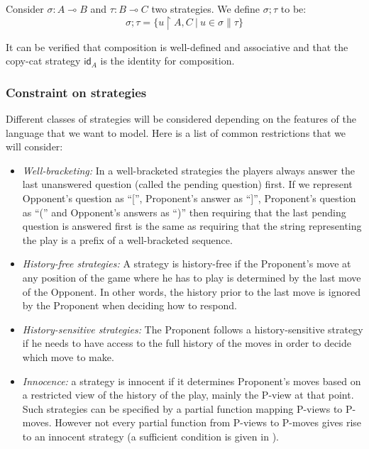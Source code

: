 \begin{dfn}
Consider $\sigma : A \multimap B$ and  $\tau : B \multimap C$ two
strategies. We define $\sigma ; \tau$ to be:
$$ \sigma ; \tau = \{ u \upharpoonright A,C \ | \ u \in \sigma \|
\tau \}$$
\end{dfn}

It can be verified that composition is well-defined and associative
\citep{hylandong_pcf} and that the copy-cat strategy $\textsf{id}_A$ is the identity for composition.

\subsubsection{Constraint on strategies}

Different classes of strategies will be considered depending on the
features of the language that we want to model. Here is a list of
common restrictions that we will consider:
\begin{itemize}
\item \emph{Well-bracketing:} In a well-bracketed strategies the players always answer the last unanswered question (called the pending question) first.
If we represent Opponent's question as ``['', Proponent's answer as
``]'', Proponent's question as ``('' and Opponent's answers as ``)''
then requiring that the last pending question is answered first is
the same as requiring that the string representing the play is a
prefix of a well-bracketed sequence.

\item \emph{History-free strategies:} A strategy is history-free if the Proponent's move at any position of the game where he has to play
is determined by the last move of the Opponent. In other words, the
history prior to the last move is ignored by the Proponent when
deciding how to respond.

\item \emph{History-sensitive strategies:} The Proponent follows a history-sensitive strategy if he needs to have access to the full
history of the moves in order to decide which move to make.

\item \emph{Innocence:} a strategy is innocent if it determines Proponent's moves based on a restricted view of the history of the play, mainly the P-view
at that point. Such strategies can be specified by a partial
function mapping P-views to P-moves. However not every partial
function from P-views to P-moves gives rise to an innocent strategy
(a sufficient condition is given in \cite{hylandong_pcf}).
\end{itemize}

